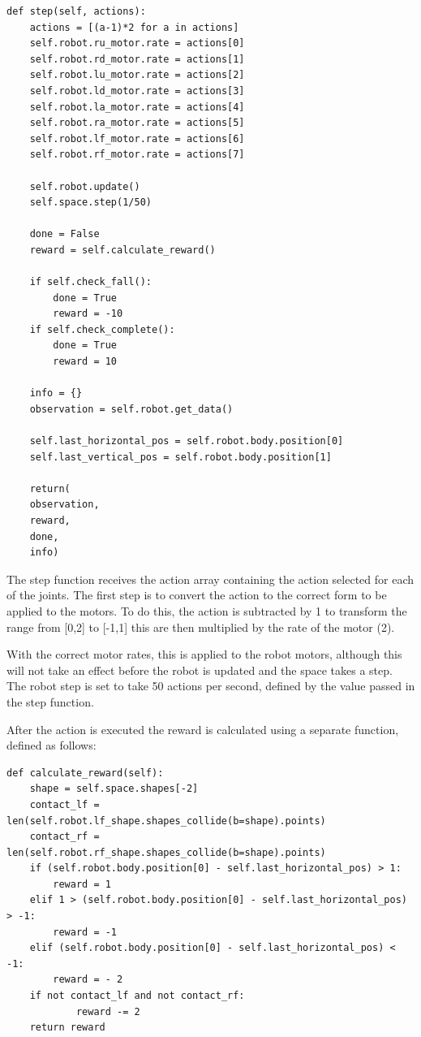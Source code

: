 \lstset{language=Python}
\lstset{frame=lines}
\lstset{basicstyle=\footnotesize}
\begin{lstlisting}
def step(self, actions):
    actions = [(a-1)*2 for a in actions]
    self.robot.ru_motor.rate = actions[0]
    self.robot.rd_motor.rate = actions[1]
    self.robot.lu_motor.rate = actions[2]
    self.robot.ld_motor.rate = actions[3]
    self.robot.la_motor.rate = actions[4]
    self.robot.ra_motor.rate = actions[5]
    self.robot.lf_motor.rate = actions[6]
    self.robot.rf_motor.rate = actions[7]

    self.robot.update()
    self.space.step(1/50)

    done = False
    reward = self.calculate_reward()

    if self.check_fall():
        done = True
        reward = -10 
    if self.check_complete(): 
        done = True  
        reward = 10

    info = {}
    observation = self.robot.get_data()

    self.last_horizontal_pos = self.robot.body.position[0]
    self.last_vertical_pos = self.robot.body.position[1]

    return(
    observation,
    reward,
    done,
    info)

\end{lstlisting}

The step function receives the action array containing the action selected for each of the joints.
The first step is to convert the action to the correct form to be applied to the motors. To do this, the action is subtracted by 1 to transform the range from [0,2] to [-1,1] this are then multiplied by the rate of the motor (2).

With the correct motor rates, this is applied to the robot motors, although this will not take an effect before the robot is updated and the space takes a step.
The robot step is set to take 50 actions per second, defined by the value passed in the step function.

After the action is executed the reward is calculated using a separate function, defined as follows:


\begin{lstlisting}
def calculate_reward(self):
    shape = self.space.shapes[-2]
    contact_lf = len(self.robot.lf_shape.shapes_collide(b=shape).points)
    contact_rf = len(self.robot.rf_shape.shapes_collide(b=shape).points)
    if (self.robot.body.position[0] - self.last_horizontal_pos) > 1:
        reward = 1
    elif 1 > (self.robot.body.position[0] - self.last_horizontal_pos) > -1:
        reward = -1
    elif (self.robot.body.position[0] - self.last_horizontal_pos) < -1:
        reward = - 2
    if not contact_lf and not contact_rf:
            reward -= 2
    return reward
\end{lstlisting}

